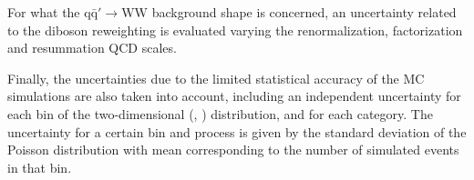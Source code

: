 
For what the $\mathrm{q\bar{q}'\to WW}$ background shape is concerned, an uncertainty related to the diboson \pt reweighting is evaluated varying the renormalization, factorization and resummation QCD scales.

Finally, the uncertainties due to the limited statistical accuracy of the MC simulations are also taken into account, including an independent uncertainty for each bin of the two-dimensional  (\mll, \mt) distribution, and for each category. The uncertainty for a certain bin and process is given by the standard deviation of the Poisson distribution with mean corresponding to the number of simulated events in that bin.

 
